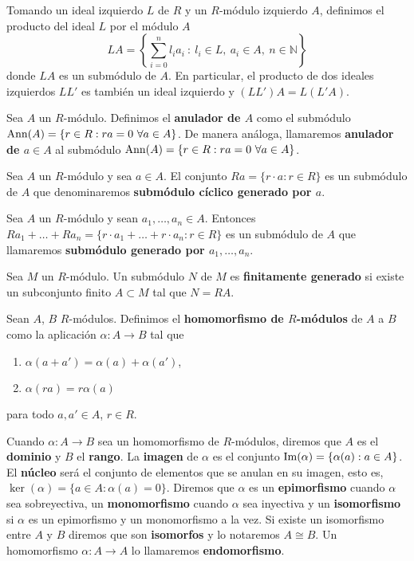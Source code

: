 Tomando un ideal izquierdo \(L\) de \(R\) y un \(R\)-módulo izquierdo \(A\), definimos
el producto del ideal \(L\) por el módulo \(A\)
\[
	LA = \left\lbrace \sum_{i=0}^{n} l_{i}a_{i} \ : \ l_{i} \in L,\ a_{i} \in A,\ n
	\in \mathbb{N}\right\rbrace
\]
donde \(LA\) es un submódulo de \(A\). En particular, el producto de dos ideales
izquierdos \(LL'\) es también un ideal izquierdo y \((LL')A = L(L'A)\).
\begin{definicion}
	Sea \(A\) un \(R\)-módulo. Definimos el \textbf{anulador de \(A\)} como el submódulo
	\(\ann(A) = \{r \in R : ra=0 \ \forall a \in A\}\). De manera análoga, llamaremos
	\textbf{anulador de \(a \in A\)} al submódulo
	\(\ann(A) = \{r \in R : ra=0 \ \forall a \in A\}\).
\end{definicion}
\begin{definicion}
	Sea \(A\) un \(R\)-módulo y sea \(a \in A\). El conjunto
	\(Ra = \{r \cdot a : r \in R\}\) es un submódulo de \(A\) que denominaremos
	\textbf{submódulo cíclico generado por \(a\)}.
\end{definicion}
\begin{definicion}
	Sea \(A\) un \(R\)-módulo y sean \(a_{1}, \ldots, a_{n} \in A\). Entonces
	\(Ra_{1} + \ldots + Ra_{n} = \{r \cdot a_{1} + \ldots + r \cdot a_{n} : r \in R\}\)
	es un submódulo de \(A\) que llamaremos \textbf{submódulo generado por
	\(a_{1}, \ldots, a_{n}\)}.
\end{definicion}
\begin{definicion}
	Sea \(M\) un \(R\)-módulo. Un submódulo \(N\) de \(M\) es \textbf{finitamente generado}
	si existe un subconjunto finito \(A \subset M\) tal que \(N = RA\).
\end{definicion}
\begin{definicion}
	Sean \(A\), \(B\) \(R\)-módulos. Definimos el \textbf{homomorfismo de \(R\)-módulos}
	de \(A\) a \(B\) como la aplicación \(\alpha: A \rightarrow B\) tal que
	\begin{enumerate}
		\item \(\alpha(a+a') = \alpha(a) + \alpha(a')\),
		\item \(\alpha(ra) = r\alpha(a)\)
	\end{enumerate}
	para todo \(a,a' \in A\), \(r \in R\).
\end{definicion}

Cuando \(\alpha: A \rightarrow B\) sea un homomorfismo de \(R\)-módulos, diremos que
\(A\) es el \textbf{dominio} y \(B\) el \textbf{rango}. La \textbf{imagen} de \(\alpha\)
es el conjunto \(\operatorname{Im}(\alpha) = \{ \alpha(a) : a \in A \}\). El \textbf{núcleo} será
el conjunto de elementos que se anulan en su imagen, esto es, \(\ker(\alpha) = \{
a \in A : \alpha(a) = 0 \}\). Diremos que \(\alpha\) es un \textbf{epimorfismo} cuando
\(\alpha\) sea sobreyectiva, un \textbf{monomorfismo} cuando \(\alpha\) sea inyectiva
y un \textbf{isomorfismo} si \(\alpha\) es un epimorfismo y un monomorfismo a la
vez. Si existe un isomorfismo entre \(A\) y \(B\) diremos que son \textbf{isomorfos}
y lo notaremos \(A \cong B\). Un homomorfismo \(\alpha: A \rightarrow A\) lo llamaremos
\textbf{endomorfismo}.


